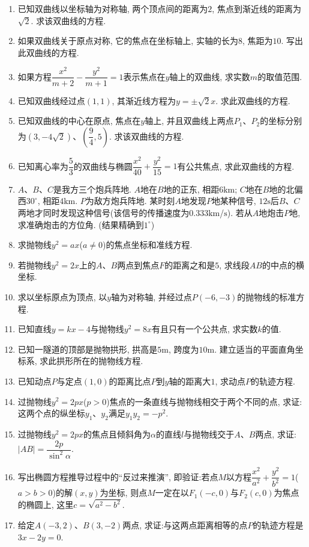 \documentclass[10pt,a4paper]{article}
\begin{document}
\begin{enumerate}[1.]
\item 已知双曲线以坐标轴为对称轴, 两个顶点间的距离为$2$, 焦点到渐近线的距离为$\sqrt 2$. 求该双曲线的方程.
\item 如果双曲线关于原点对称, 它的焦点在坐标轴上, 实轴的长为$8$, 焦距为$10$. 写出此双曲线的方程.
\item 如果方程$\dfrac{x^2}{m+2}-\dfrac{y^2}{m+1}=1$表示焦点在$y$轴上的双曲线, 求实数$m$的取值范围.
\item 已知双曲线经过点$(1, 1)$, 其渐近线方程为$y=\pm\sqrt 2x$. 求此双曲线的方程.
\item 已知双曲线的中心在原点, 焦点在$y$轴上, 并且双曲线上两点$P_1$、$P_2$的坐标分别为$(3, -4\sqrt 2)$、$(\dfrac 94, 5)$. 求该双曲线的方程.
\item 已知离心率为$\dfrac 53$的双曲线与椭圆$\dfrac{x^2}{40}+\dfrac{y^2}{15}=1$有公共焦点, 求此双曲线的方程.
\item $A$、$B$、$C$是我方三个炮兵阵地. $A$地在$B$地的正东, 相距$6\text{km}$; $C$地在$B$地的北偏西$30^\circ$, 相距$4\text{km}$. $P$为敌方炮兵阵地. 某时刻$A$地发现$P$地某种信号, $12\text{s}$后$B$、$C$两地才同时发现这种信号(该信号的传播速度为$0. 333\text{km}$/$\text{s}$). 若从$A$地炮击$P$地, 求准确炮击的方位角. (结果精确到$1^\circ$)
\item 求抛物线$y^2=ax$($a\ne 0$)的焦点坐标和准线方程.
\item 若抛物线$y^2=2x$上的$A$、$B$两点到焦点$F$的距离之和是$5$, 求线段$AB$的中点的横坐标.
\item 求以坐标原点为顶点, 以$y$轴为对称轴, 并经过点$P(-6, -3)$的抛物线的标准方程.
\item 已知直线$y=kx-4$与抛物线$y^2=8x$有且只有一个公共点, 求实数$k$的值.
\item 已知一隧道的顶部是抛物拱形, 拱高是$5\text{m}$, 跨度为$10\text{m}$. 建立适当的平面直角坐标系, 求此拱形所在的抛物线方程.
\item 已知动点$P$与定点$(1, 0)$的距离比点$P$到$y$轴的距离大$1$, 求动点$P$的轨迹方程.
\item 过抛物线$y^2=2px$($p>0$)焦点的一条直线与抛物线相交于两个不同的点, 求证: 这两个点的纵坐标$y_1$、$y_2$满足$y_1y_2=-p^2$.
\item 过抛物线$y^2=2px$的焦点且倾斜角为$\alpha$的直线$l$与抛物线交于$A$、$B$两点, 求证:$|AB|=\dfrac{2p}{\sin^2\alpha}$.
\item 写出椭圆方程推导过程中的``反过来推演'', 即验证:若点$M$以方程$\dfrac{x^2}{a^2}+\dfrac{y^2}{b^2}=1$($a>b>0$)的解$(x, y)$为坐标, 则点$M$一定在以$F_1(-c, 0)$与$F_2(c, 0)$为焦点的椭圆上, 这里$c=\sqrt{a^2-b^2}$.
\item 给定$A(-3, 2)$、$B(3, -2)$两点, 求证:与这两点距离相等的点$P$的轨迹方程是$3x-2y=0$.

\end{enumerate}
\end{document}
